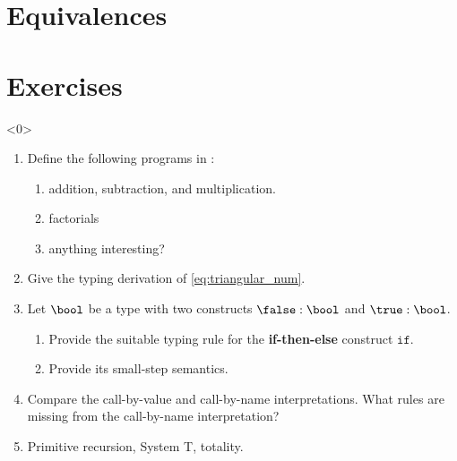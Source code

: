 \section{Equivalences}
\begin{frame}
\end{frame}
\section*{Exercises}
\begin{frame}<0>
  \begin{enumerate}
    \item Define the following programs in \PCF{}:
      \begin{enumerate}
        \item addition, subtraction, and multiplication. 
        \item factorials
        \item anything interesting? 
      \end{enumerate}
    \item Give the typing derivation of \eqref{eq:triangular_num}.
    \item Let $\bool$ be a type with two constructs $\false : \bool$
      and $\true : \bool$.
      \begin{enumerate}
        \item Provide the suitable typing rule for
          the \textbf{if-then-else} construct
          $\mathtt{if}$.
        \item Provide its small-step semantics.
      \end{enumerate}
    \item Compare the call-by-value and call-by-name interpretations. What
      rules are missing from the call-by-name interpretation?
    \item Primitive recursion, System T, totality. 
  \end{enumerate}
\end{frame}


